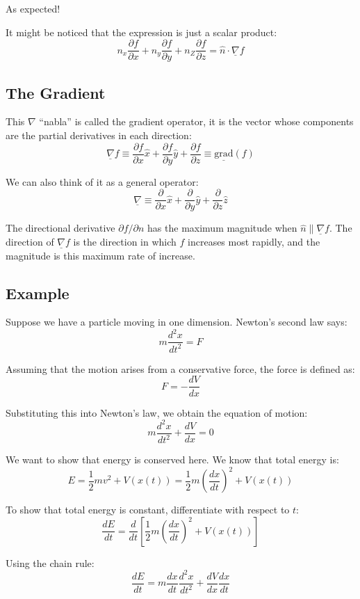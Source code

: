 As expected!

It might be noticed that the expression is just a scalar product:
\[
    n_x \frac{\partial f}{\partial x} + n_y \frac{\partial f}{\partial y} + n_Z \frac{\partial f}{\partial z} = \hat{n} \cdot \underline{\nabla} f
\]

\subsection{The Gradient}
This $\nabla$ ``nabla'' is called the gradient operator, it is the vector whose components are the partial derivatives in each direction:
\[
    \underline{\nabla} f \equiv \frac{\partial f}{\partial x} \hat{x} + \frac{\partial f}{\partial y} \hat{y} + \frac{\partial f}{\partial z} \equiv \underline{\text{grad}}(f)
\]

We can also think of it as a general operator:
\[
    \underline{\nabla} \equiv \frac{\partial}{\partial x} \hat{x} + \frac{\partial}{\partial y} \hat{y} + \frac{\partial}{\partial z} \hat{z}
\]

The directional derivative $\partial f /\partial n$ has the maximum magnitude when $\hat{n} \parallel \underline{\nabla}f$. The direction of $\underline{\nabla} f$ is the direction in which $f$ increases most rapidly, and the magnitude is this maximum rate of increase.

\subsection{Example}
Suppose we have a particle moving in one dimension. Newton's second law says:
\[
    m \frac{d^2 x}{dt^2} = F
\]

Assuming that the motion arises from a conservative force, the force is defined as:
\[
    F = -\frac{dV}{dx}
\]

Substituting this into Newton's law, we obtain the equation of motion:
\[
    m \frac{d^2 x}{dt^2} + \frac{dV}{dx} = 0
\]

We want to show that energy is conserved here. We know that total energy is:
\[
    E = \frac{1}{2}mv^2 + V(x(t)) = \frac{1}{2}m \left(\frac{dx}{dt}\right)^2 + V(x(t))
\]

To show that total energy is constant, differentiate with respect to $t$:
\[
    \frac{dE}{dt} = \frac{d}{dt} \left[ \frac{1}{2}m \left(\frac{dx}{dt}\right)^2 + V(x(t)) \right]
\]

Using the chain rule:
\[
    \frac{dE}{dt} = m \frac{dx}{dt} \frac{d^2 x}{dt^2} + \frac{dV}{dx} \frac{dx}{dt}
\]

